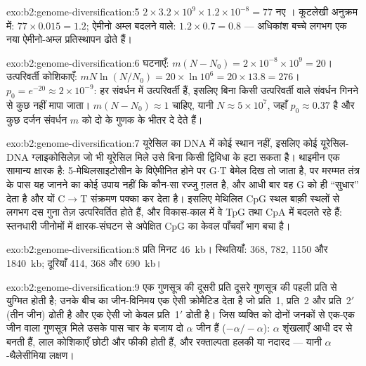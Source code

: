 \begin{solution}{exo:b2:genome-diversification:5}
$2\times 3.2\times 10^{9}\times 1.2\times 10^{-8} = 77$ नए ।
कूटलेखी अनुक्रम में: $77\times 0.015 = 1.2$; ऐमीनो अम्ल बदलने वाले:
$1.2\times 0.7 = 0.8$ --- अधिकांश बच्चे लगभग एक नया ऐमीनो-अम्ल
प्रतिस्थापन ढोते हैं।
\end{solution}

\begin{solution}{exo:b2:genome-diversification:6}
घटनाएँ: $m(N - N_0) = 2\times 10^{-8}\times 10^{9} = 20$। उत्परिवर्ती
कोशिकाएँ: $mN\ln(N/N_0) = 20\times \ln 10^{6} = 20\times 13.8 = 276$।
$p_0 = e^{-20} \approx 2\times 10^{-9}$: हर संवर्धन में उत्परिवर्ती हैं,
इसलिए बिना किसी उत्परिवर्ती वाले संवर्धन गिनने से कुछ नहीं मापा जाता।
$m(N -
N_0) \approx 1$ चाहिए, यानी $N \approx 5\times 10^{7}$, जहाँ $p_0 \approx
0.37$ है और कुछ दर्जन संवर्धन $m$ को दो के गुणक के भीतर दे देते हैं।
\end{solution}

\begin{solution}{exo:b2:genome-diversification:7}
यूरेसिल का DNA में कोई स्थान नहीं, इसलिए कोई यूरेसिल-DNA ग्लाइकोसिलेज़
जो भी यूरेसिल मिले उसे बिना किसी द्विविधा के हटा सकता है। थाइमीन एक
सामान्य क्षारक है: 5-मेथिलसाइटोसीन के विऐमीनित होने पर G$\cdot$T बेमेल
दिख तो जाता है, पर मरम्मत तंत्र के पास यह जानने का कोई उपाय नहीं कि
कौन-सा रज्जु ग़लत है, और आधी बार वह G को ही ``सुधार'' देता है और यों
C$\to$T संक्रमण पक्का कर देता है। इसलिए मेथिलित CpG स्थल बाक़ी स्थलों से
लगभग दस गुना तेज़ उत्परिवर्तित होते हैं, और विकास-काल में वे TpG तथा CpA
में बदलते रहे हैं: स्तनधारी जीनोमों में क्षारक-संघटन से अपेक्षित CpG का
केवल पाँचवाँ भाग बचा है।
\end{solution}

\begin{solution}{exo:b2:genome-diversification:8}
प्रति मिनट \qty{46}{kb}। स्थितियाँ: 368, 782, 1150 और
\qty{1840}{kb}; दूरियाँ 414, 368 और \qty{690}{kb}।
\end{solution}

\begin{solution}{exo:b2:genome-diversification:9}
एक गुणसूत्र की दूसरी प्रति दूसरे गुणसूत्र की पहली प्रति से युग्मित होती
है; उनके बीच का जीन-विनिमय एक ऐसी क्रोमैटिड देता है जो प्रति~1, प्रति~2
और प्रति~2$'$ (तीन जीन) ढोती है और एक ऐसी जो केवल
प्रति~1$'$ ढोती है। जिस व्यक्ति को दोनों जनकों से एक-एक जीन वाला
गुणसूत्र मिले उसके पास चार के बजाय दो $\alpha$ जीन हैं
($-\alpha/-\alpha$): $\alpha$ शृंखलाएँ आधी दर से बनती हैं, लाल कोशिकाएँ
छोटी और फीकी होती हैं, और रक्ताल्पता हलकी या नदारद --- यानी
$\alpha$-थैलेसीमिया लक्षण।
\end{solution}

